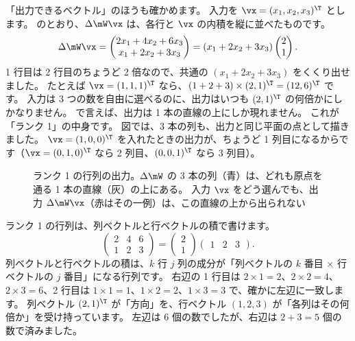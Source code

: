 「出力できるベクトル」のほうも確かめます。
入力を $\vx=(x_1,x_2,x_3)^\T$ とします。
のとおり、$\Delta\mW\vx$ は、各行と $\vx$ の内積を縦に並べたものです。
\[
\Delta\mW\vx
=\begin{pmatrix}2x_1+4x_2+6x_3\\ x_1+2x_2+3x_3\end{pmatrix}
=(x_1+2x_2+3x_3)\begin{pmatrix}2\\1\end{pmatrix}.
\]
1 行目は 2 行目のちょうど 2 倍なので、共通の $(x_1+2x_2+3x_3)$ をくくり出せました。
たとえば $\vx=(1,1,1)^\T$ なら、$(1+2+3)\times(2,1)^\T=(12,6)^\T$ です。
入力は 3 つの数を自由に選べるのに、出力はいつも $(2,1)^\T$ の何倍かにしかなりません。
で言えば、出力は 1 本の直線の上にしか現れません。
これが「ランク 1」の中身です。
図では、3 本の列も、出力と同じ平面の点として描きました。
$\vx=(1,0,0)^\T$ を入れたときの出力が、ちょうど 1 列目になるからです（$\vx=(0,1,0)^\T$ なら 2 列目、$(0,0,1)^\T$ なら 3 列目）。

\begin{figure}[tbp]
\centering
{}
\caption{ランク 1 の行列の出力。$\Delta\mW$ の 3 本の列（青）は、どれも原点を通る 1 本の直線（灰）の上にある。
入力 $\vx$ をどう選んでも、出力 $\Delta\mW\vx$（赤はその一例）は、この直線の上から出られない}
\label{fig:lora-rank1}
\end{figure}

ランク 1 の行列は、列ベクトルと行ベクトルの積で書けます。
\[
\begin{pmatrix}2 & 4 & 6\\ 1 & 2 & 3\end{pmatrix}
=\begin{pmatrix}2\\1\end{pmatrix}\begin{pmatrix}1 & 2 & 3\end{pmatrix}.
\]
列ベクトルと行ベクトルの積は、$k$ 行 $j$ 列の成分が「列ベクトルの $k$ 番目 × 行ベクトルの $j$ 番目」になる行列です。
右辺の 1 行目は $2\times1=2$、$2\times2=4$、$2\times3=6$、2 行目は $1\times1=1$、$1\times2=2$、$1\times3=3$ で、確かに左辺に一致します。
列ベクトル $(2,1)^\T$ が「方向」を、行ベクトル $(1,2,3)$ が「各列はその何倍か」を受け持っています。
左辺は 6 個の数でしたが、右辺は $2+3=5$ 個の数で済みました。

